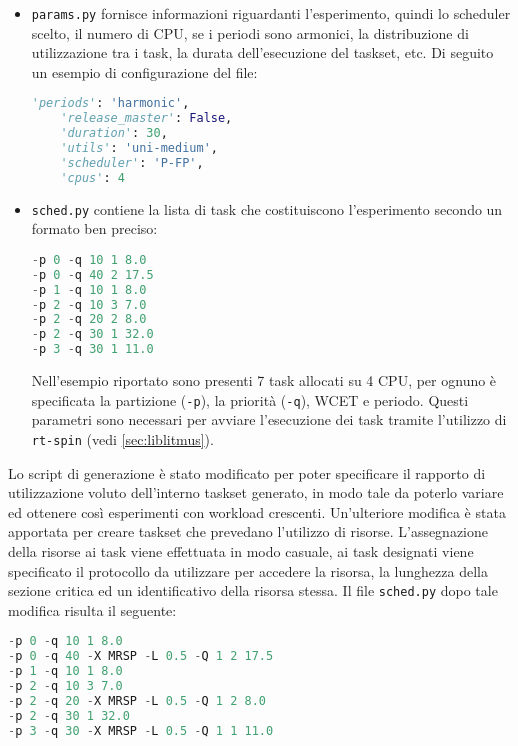 \begin{appendices}
\begin{itemize}
	\item \texttt{params.py} fornisce informazioni riguardanti l'esperimento, quindi lo scheduler scelto, il numero di CPU, se i periodi sono armonici, la distribuzione di utilizzazione tra i task, la durata dell'esecuzione del taskset, etc. Di seguito un esempio di configurazione del file:\\

 \begin{lstlisting}[frame=single,language=Python]  % Start your code-block
	'periods': 'harmonic',
	'release_master': False,
	'duration': 30,
 	'utils': 'uni-medium',
 	'scheduler': 'P-FP',
 	'cpus': 4
\end{lstlisting}

	\item \texttt{sched.py} contiene la lista di task che costituiscono l'esperimento secondo un formato ben preciso: \\

 \begin{lstlisting}[frame=single,language=Python]  % Start your code-block
-p 0 -q 10 1 8.0
-p 0 -q 40 2 17.5
-p 1 -q 10 1 8.0
-p 2 -q 10 3 7.0
-p 2 -q 20 2 8.0
-p 2 -q 30 1 32.0
-p 3 -q 30 1 11.0
\end{lstlisting}

Nell'esempio riportato sono presenti 7 task allocati su 4 CPU, per ognuno è specificata la partizione (\texttt{-p}), la priorità (\texttt{-q}), WCET e periodo. Questi parametri sono necessari per avviare l'esecuzione dei task tramite l'utilizzo di \texttt{rt-spin} (vedi \ref{sec:liblitmus}).

 \end{itemize}

 Lo script di generazione è stato modificato per poter specificare il rapporto di utilizzazione voluto dell'interno taskset generato, in modo tale da poterlo variare ed ottenere così esperimenti con workload crescenti. Un'ulteriore modifica è stata apportata per creare taskset che prevedano l'utilizzo di risorse. L'assegnazione della risorse ai task viene effettuata in modo casuale, ai task designati viene specificato il protocollo da utilizzare per accedere la risorsa, la lunghezza della sezione critica ed un identificativo della risorsa stessa. Il file \texttt{sched.py} dopo tale modifica risulta il seguente:\\

 \begin{lstlisting}[frame=single,language=Python]  % Start your code-block
-p 0 -q 10 1 8.0
-p 0 -q 40 -X MRSP -L 0.5 -Q 1 2 17.5
-p 1 -q 10 1 8.0
-p 2 -q 10 3 7.0
-p 2 -q 20 -X MRSP -L 0.5 -Q 1 2 8.0
-p 2 -q 30 1 32.0
-p 3 -q 30 -X MRSP -L 0.5 -Q 1 1 11.0
\end{lstlisting}


\end{appendices}
